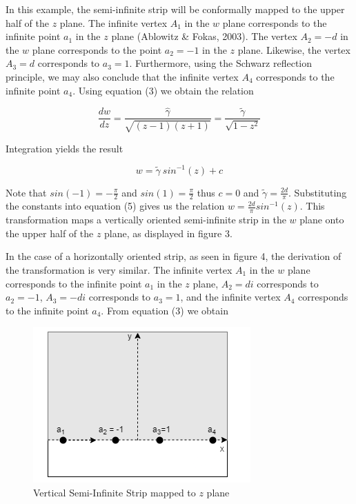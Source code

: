 \documentclass{article}
\begin{document}
    In this example, the semi-infinite strip will be conformally mapped to the upper half of the $z$ plane. The infinite vertex \(A_{1}\) in the $w$ plane corresponds to the infinite point \(a_{1}\) in the $z$ plane (Ablowitz \& Fokas, 2003). The vertex \(A_{2} = -d\) in the $w$ plane corresponds to the point \(a_{2} = -1\) in the $z$ plane. Likewise, the vertex \(A_{3} = d\) corresponds to \(a_{3} = 1\). Furthermore, using the Schwarz reflection principle, we may also conclude that the infinite vertex \(A_{4}\) corresponds to the infinite point \(a_{4}\). Using equation (3) we obtain the relation
    
    \begin{equation}
        \frac{dw}{dz} = \frac{\hat{\gamma}}{\sqrt{(z-1)(z+1)}} = \frac{\tilde{\gamma}}{\sqrt{1-z^{2}}}
    \end{equation}
    
    Integration yields the result
    
    \begin{equation}
        w = \tilde{\gamma} \ sin^{-1}(z) + c
    \end{equation}
    
    Note that \(sin(-1) = -\frac{\pi}{2}\) and \(sin(1) = \frac{\pi}{2}\) thus \(c = 0\) and \(\tilde{\gamma} = \frac{2d}{\pi}\). Substituting the constants into equation (5) gives us the relation \(w = \frac{2d}{\pi}sin^{-1}(z)\). This transformation maps a vertically oriented semi-infinite strip in the $w$ plane onto the upper half of the $z$ plane, as displayed in figure 3. 
    
    In the case of a horizontally oriented strip, as seen in figure 4, the derivation of the transformation is very similar. The infinite vertex \(A_{1}\) in the $w$ plane corresponds to the infinite point \(a_{1}\) in the $z$ plane, \(A_{2} = di\) corresponds to \(a_{2} = - 1\), \(A_{3} = -di\) corresponds to \(a_{3} = 1\), and the infinite vertex \(A_{4}\) corresponds to the infinite point \(a_{4}\). From equation (3) we obtain 
    
    \begin{figure}
        \centering            
        \includegraphics[scale = .75 ]{Vertivle strip z-plane.png}
        \caption{Vertical Semi-Infinite Strip mapped to $z$ plane}
        \label{fig:my_label}
    \end{figure}
    
\end{document}
